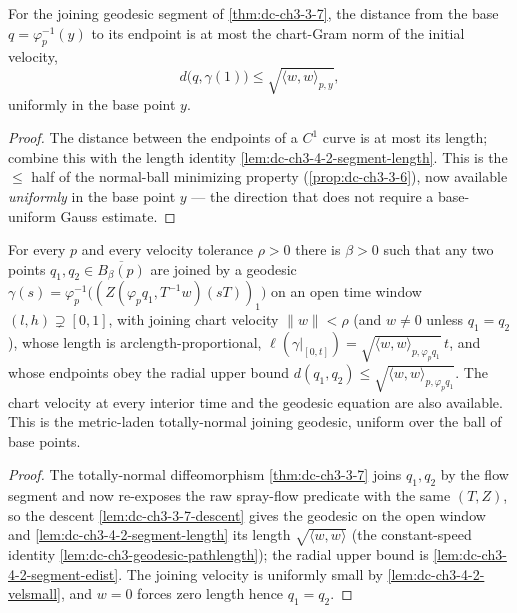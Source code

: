 \begin{lemma}
  \label{lem:dc-ch3-4-2-segment-edist}
  \leanok
  For the joining geodesic segment of \cref{thm:dc-ch3-3-7}, the distance from the base
  $q=\varphi_p^{-1}(y)$ to its endpoint is at most the chart-Gram norm of the initial velocity,
  \[
    d\big(q,\gamma(1)\big)\le\sqrt{\langle w,w\rangle_{p,y}},
  \]
  uniformly in the base point $y$.
\end{lemma}
\begin{proof}
  \sketch
  \leanok
  The distance between the endpoints of a $C^1$ curve is at most its length; combine this with the
  length identity \cref{lem:dc-ch3-4-2-segment-length}. This is the $\le$ half of the normal-ball
  minimizing property (\cref{prop:dc-ch3-3-6}), now available \emph{uniformly} in the base point $y$
  --- the direction that does not require a base-uniform Gauss estimate.
\end{proof}

\begin{lemma}
  \label{lem:dc-ch3-4-2-join-metric}
  \leanok
  For every $p$ and every velocity tolerance $\rho>0$ there is $\beta>0$ such that any two points
  $q_1,q_2\in\overline{B_\beta(p)}$ are joined by a geodesic
  $\gamma(s)=\varphi_p^{-1}\big((Z(\varphi_p q_1,T^{-1}w)(sT))_1\big)$ on an open time window
  $(l,h)\supsetneq[0,1]$, with joining chart velocity $\|w\|<\rho$ (and $w\neq0$ unless $q_1=q_2$),
  whose length is arclength-proportional,
  $\ell(\gamma|_{[0,t]})=\sqrt{\langle w,w\rangle_{p,\varphi_p q_1}}\,t$, and whose endpoints obey the
  radial upper bound $d(q_1,q_2)\le\sqrt{\langle w,w\rangle_{p,\varphi_p q_1}}$. The chart velocity at
  every interior time and the geodesic equation are also available. This is the metric-laden
  totally-normal joining geodesic, uniform over the ball of base points.
\end{lemma}
\begin{proof}
  \sketch
  \leanok
  The totally-normal diffeomorphism \cref{thm:dc-ch3-3-7} joins $q_1,q_2$ by the flow segment and now
  re-exposes the raw spray-flow predicate with the same $(T,Z)$, so the descent
  \cref{lem:dc-ch3-3-7-descent} gives the geodesic on the open window and
  \cref{lem:dc-ch3-4-2-segment-length} its length $\sqrt{\langle w,w\rangle}$ (the constant-speed
  identity \cref{lem:dc-ch3-geodesic-pathlength}); the radial upper bound is
  \cref{lem:dc-ch3-4-2-segment-edist}. The joining velocity is uniformly small by
  \cref{lem:dc-ch3-4-2-velsmall}, and $w=0$ forces zero length hence $q_1=q_2$.
\end{proof}

